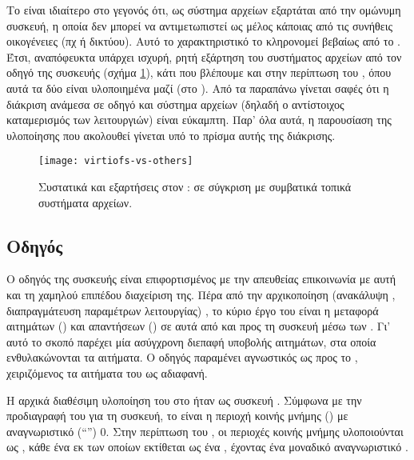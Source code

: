 Το \viofs{} είναι ιδιαίτερο στο γεγονός ότι, ως σύστημα αρχείων εξαρτάται από
την ομώνυμη συσκευή, η οποία δεν μπορεί να αντιμετωπιστεί ως μέλος κάποιας από
τις συνήθεις οικογένειες (πχ  ή δικτύου). Αυτό το χαρακτηριστικό το
κληρονομεί βεβαίως από το . Έτσι, αναπόφευκτα υπάρχει ισχυρή, ρητή
εξάρτηση του \viofs{} συστήματος αρχείων από τον οδηγό της \viofs{} συσκευής
(σχήμα \ref{fig:virtiofs-vs-others}), κάτι που βλέπουμε και στην περίπτωση του
\linux{}, όπου αυτά τα δύο είναι υλοποιημένα μαζί (στο
). Από τα παραπάνω γίνεται σαφές ότι η διάκριση
ανάμεσα σε \viofs{} οδηγό και σύστημα αρχείων (δηλαδή ο αντίστοιχος καταμερισμός
των λειτουργιών) είναι εύκαμπτη. Παρ' όλα αυτά, η παρουσίαση της υλοποίησης που
ακολουθεί γίνεται υπό το πρίσμα αυτής της διάκρισης.

\begin{figure}
    \centering
    \texttt{[image: virtiofs-vs-others]}
    \caption{Συστατικά και εξαρτήσεις στον \guest{}: \viofs{} σε σύγκριση με
        συμβατικά τοπικά συστήματα αρχείων.}
    \label{fig:virtiofs-vs-others}
\end{figure}

\subsection{Οδηγός}

Ο οδηγός της \viofs{} συσκευής είναι επιφορτισμένος με την απευθείας επικοινωνία
με αυτή και τη χαμηλού επιπέδου διαχείριση της. Πέρα από την αρχικοποίηση
(ανακάλυψη , διαπραγμάτευση παραμέτρων λειτουργίας)
\cite{virtio}, το κύριο έργο του είναι η μεταφορά αιτημάτων () και
απαντήσεων () σε αυτά από και προς τη συσκευή μέσω των
. Γι' αυτό το σκοπό παρέχει μία ασύγχρονη διεπαφή υποβολής
αιτημάτων, στα οποία ενθυλακώνονται τα  αιτήματα. Ο οδηγός παραμένει
αγνωστικός ως προς το , χειριζόμενος τα αιτήματα του ως αδιαφανή.

Η αρχικά διαθέσιμη υλοποίηση του \viofs{}  στο \qemu{} ήταν ως
συσκευή . Σύμφωνα με την προδιαγραφή του  \cite{virtio}
για τη συσκευή, το  είναι η περιοχή κοινής μνήμης () με αναγνωριστικό (``'') 0. Στην περίπτωση του
, οι περιοχές κοινής μνήμης υλοποιούνται ως
, κάθε ένα εκ των οποίων εκτίθεται ως ένα
, έχοντας ένα μοναδικό
αναγνωριστικό \cite{virtio, wiki:pci-conf, osdev:pci}.

